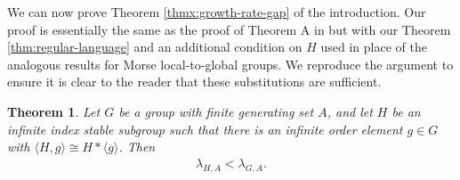 \documentclass[11pt,letterpaper]{amsart}
\newtheorem{theorem}{Theorem}[section]
\theoremstyle{definition}
\theoremstyle{plain}
\theoremstyle{TheoremNum}
\begin{document}
We can now prove Theorem \ref{thmx:growth-rate-gap} of the introduction. Our proof is essentially the same as the proof of Theorem A in \cite{CRSZ} but with our Theorem \ref{thm:regular-language} and an additional condition on $H$ used in place of the analogous results for Morse local-to-global groups. We reproduce the argument to ensure it is clear to the reader that these substitutions are sufficient. 

\begin{theorem}\label{thm:growth-rate-gap}
    Let $G$ be a group with finite generating set $A$, and let $H$ be an infinite index stable subgroup such that there is an infinite order element $g \in G$ with $\langle H , g \rangle \cong H * \langle g \rangle$. Then 
    \begin{align*}
        \lambda_{H,A} < \lambda_{G,A}\text{.}
    \end{align*}
\end{theorem}
\end{document}
